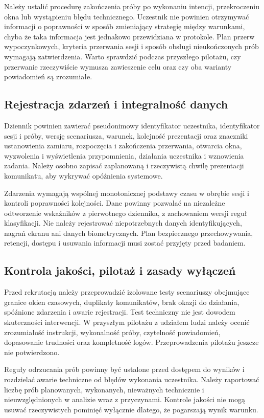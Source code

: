 \documentclass[11pt,a4paper]{article}
\begin{document}
Należy ustalić procedurę zakończenia próby po wykonaniu intencji, przekroczeniu okna lub wystąpieniu błędu technicznego. Uczestnik nie powinien otrzymywać informacji o poprawności w sposób zmieniający strategię między warunkami, chyba że taka informacja jest jednakowo przewidziana w protokole. Plan przerw wypoczynkowych, kryteria przerwania sesji i sposób obsługi nieukończonych prób wymagają zatwierdzenia. Warto sprawdzić podczas przyszłego pilotażu, czy przerwanie rzeczywiście wymusza zawieszenie celu oraz czy oba warianty powiadomień są zrozumiałe.

\subsection{Rejestracja zdarzeń i integralność danych}
Dziennik powinien zawierać pseudonimowy identyfikator uczestnika, identyfikator sesji i próby, wersję scenariusza, warunek, kolejność prezentacji oraz znaczniki ustanowienia zamiaru, rozpoczęcia i zakończenia przerwania, otwarcia okna, wyzwolenia i wyświetlenia przypomnienia, działania uczestnika i wznowienia zadania. Należy osobno zapisać zaplanowaną i rzeczywistą chwilę prezentacji komunikatu, aby wykrywać opóźnienia systemowe.

Zdarzenia wymagają wspólnej monotonicznej podstawy czasu w obrębie sesji i kontroli poprawności kolejności. Dane powinny pozwalać na niezależne odtworzenie wskaźników z pierwotnego dziennika, z zachowaniem wersji reguł klasyfikacji. Nie należy rejestrować niepotrzebnych danych identyfikujących, nagrań ekranu ani danych biometrycznych. Plan bezpiecznego przechowywania, retencji, dostępu i usuwania informacji musi zostać przyjęty przed badaniem.

\subsection{Kontrola jakości, pilotaż i zasady wyłączeń}
Przed rekrutacją należy przeprowadzić izolowane testy scenariuszy obejmujące granice okien czasowych, duplikaty komunikatów, brak okazji do działania, spóźnione zdarzenia i awarie rejestracji. Test techniczny nie jest dowodem skuteczności interwencji. W przyszłym pilotażu z udziałem ludzi należy ocenić zrozumiałość instrukcji, wykonalność próby, czytelność powiadomień, dopasowanie trudności oraz kompletność logów. Przeprowadzenia pilotażu jeszcze nie potwierdzono.

Reguły odrzucania prób powinny być ustalone przed dostępem do wyników i rozdzielać awarie techniczne od błędów wykonania uczestnika. Należy raportować liczbę prób planowanych, wykonanych, nieważnych technicznie i nieuwzględnionych w analizie wraz z przyczynami. Kontrole jakości nie mogą usuwać rzeczywistych pominięć wyłącznie dlatego, że pogarszają wynik warunku.
\end{document}
